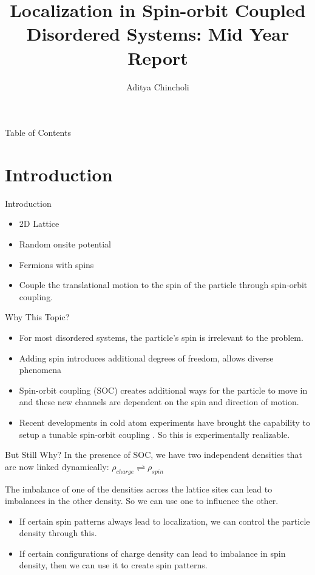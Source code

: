 \documentclass[]{beamer}
\title{Localization in Spin-orbit Coupled Disordered Systems: Mid Year Report}
\author{Aditya Chincholi}
\institute{Indian Institute of Science Education and Research, Pune}
\begin{document}
\frame{\titlepage}

\begin{frame}{Table of Contents}
    \tableofcontents
\end{frame}

\section{Introduction}
\begin{frame}{Introduction}
\begin{itemize}
    \item 2D Lattice
    \item Random onsite potential
    \item Fermions with spins
    \item Couple the translational motion to the spin
        of the particle through spin-orbit coupling.
\end{itemize}
\end{frame}

\begin{frame}{Why This Topic?}
    \begin{itemize}
        \item For most disordered systems, the particle's
        spin is irrelevant to the problem.
        \item Adding spin introduces additional degrees of
        freedom, allows diverse phenomena
        \item Spin-orbit coupling (SOC) creates additional
        ways for the particle to move in and these new
        channels are dependent on the spin and direction of
        motion.
        \item Recent developments in cold atom experiments
        have brought the capability to setup a tunable
        spin-orbit coupling
        \cite{orsoAndersonTransitionCold2017,
        huangExperimentalRealizationTwodimensional2016}.
        So this is experimentally realizable.
    \end{itemize}
\end{frame}

\begin{frame}{But Still Why?}
    In the presence of SOC, we have two independent
    densities that are now linked dynamically:
    $\rho_{charge} \rightleftharpoons \rho_{spin}$
    
    The imbalance of one of the densities across the lattice
    sites can lead to imbalances in the other density. So we
    can use one to influence the other. 

    \begin{itemize}
        \item If certain spin patterns always lead to
        localization, we can control the particle density
        through this.
        \item If certain configurations of charge density
        can lead to imbalance in spin density, then we can
        use it to create spin patterns.
    \end{itemize}
\end{frame}
\end{document}
